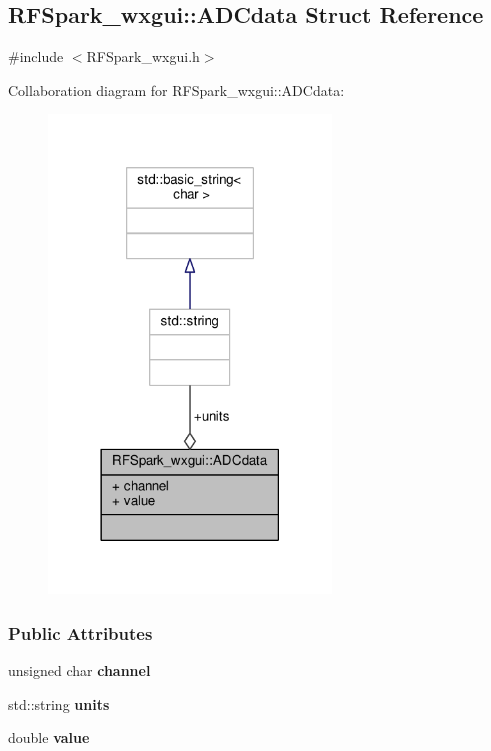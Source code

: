 \subsection{R\+F\+Spark\+\_\+wxgui\+:\+:A\+D\+Cdata Struct Reference}
\label{structRFSpark__wxgui_1_1ADCdata}


{\ttfamily \#include $<$R\+F\+Spark\+\_\+wxgui.\+h$>$}



Collaboration diagram for R\+F\+Spark\+\_\+wxgui\+:\+:A\+D\+Cdata\+:
\nopagebreak
\begin{figure}[H]
\begin{center}
\leavevmode
\includegraphics[width=213pt]{de/d67/structRFSpark__wxgui_1_1ADCdata__coll__graph}
\end{center}
\end{figure}
\subsubsection*{Public Attributes}
\begin{DoxyCompactItemize}
\item 
unsigned char {\bf channel}
\item 
std\+::string {\bf units}
\item 
double {\bf value}
\end{DoxyCompactItemize}


